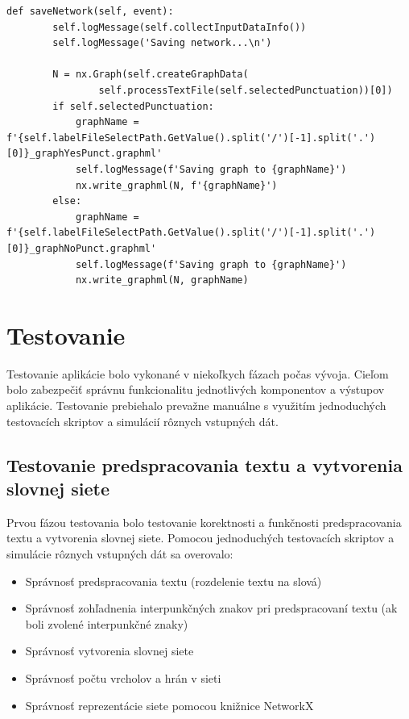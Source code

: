 \begin{lstlisting}[caption={Uloženie siete do súboru.}, label={lst:saveNetwork}]
    def saveNetwork(self, event):
        self.logMessage(self.collectInputDataInfo())
        self.logMessage('Saving network...\n')

        N = nx.Graph(self.createGraphData(
                self.processTextFile(self.selectedPunctuation))[0])
        if self.selectedPunctuation:
            graphName = f'{self.labelFileSelectPath.GetValue().split('/')[-1].split('.')[0]}_graphYesPunct.graphml'
            self.logMessage(f'Saving graph to {graphName}')
            nx.write_graphml(N, f'{graphName}')
        else:
            graphName = f'{self.labelFileSelectPath.GetValue().split('/')[-1].split('.')[0]}_graphNoPunct.graphml'
            self.logMessage(f'Saving graph to {graphName}')
            nx.write_graphml(N, graphName)
\end{lstlisting}


\section{Testovanie}\label{sec:testing}

Testovanie aplikácie bolo vykonané v niekoľkych fázach počas vývoja. Cieľom bolo zabezpečiť správnu funkcionalitu jednotlivých
komponentov a výstupov aplikácie. Testovanie prebiehalo prevažne manuálne s využitím jednoduchých testovacích skriptov
a simulácií rôznych vstupných dát.

\subsection{Testovanie predspracovania textu a vytvorenia slovnej siete}\label{sec:testingPreprocessing}

Prvou fázou testovania bolo testovanie korektnosti a funkčnosti predspracovania textu a vytvorenia slovnej siete. Pomocou jednoduchých
testovacích skriptov a simulácie rôznych vstupných dát sa overovalo:
\begin{itemize}
    \item Správnosť predspracovania textu (rozdelenie textu na slová)
    \item Správnosť zohľadnenia interpunkčných znakov pri predspracovaní textu (ak boli zvolené interpunkčné znaky)
    \item Správnosť vytvorenia slovnej siete
    \item Správnosť počtu vrcholov a hrán v sieti
    \item Správnosť reprezentácie siete pomocou knižnice NetworkX
\end{itemize}


